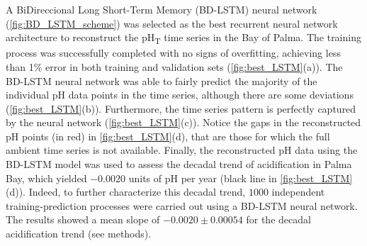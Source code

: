 A BiDireccional Long Short-Term Memory (BD-LSTM) neural network
(\cref{fig:BD_LSTM_scheme}) was selected as the best recurrent neural network
architecture to reconstruct the pH\textsubscript{T} time series in the Bay of
Palma. The training process was successfully completed with no signs of
overfitting, achieving less than 1\% error in both training and validation sets
(\cref{fig:best_LSTM}(a)). The BD-LSTM neural network was able to fairly
predict the majority of the individual pH data points in the time series,
although there are some deviations (\cref{fig:best_LSTM}(b)). Furthermore, the
time series pattern is perfectly captured by the neural network
(\cref{fig:best_LSTM}(c)). Notice the gaps in the reconstructed pH points (in
red) in \cref{fig:best_LSTM}(d), that are those for which the full ambient
time series is not available. Finally, the reconstructed pH data using the
BD-LSTM model was used to assess the decadal trend of acidification in Palma
Bay, which yielded $-0.0020$ units of pH per year (black line in
\cref{fig:best_LSTM}(d)). Indeed, to further characterize this decadal trend,
$1000$ independent training-prediction processes were carried out using a
BD-LSTM neural network. The results showed a mean slope of  $-0.0020 \pm
    0.00054$ for the decadal acidification trend (see methods).

